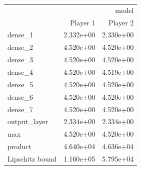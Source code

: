 \begin{tabular}{lrr}
\toprule
 & \multicolumn{2}{r}{model} \\
 & Player 1 & Player 2 \\
\midrule
dense\_1 & 2.332e+00 & 2.330e+00 \\
dense\_2 & 4.520e+00 & 4.520e+00 \\
dense\_3 & 4.520e+00 & 4.520e+00 \\
dense\_4 & 4.520e+00 & 4.519e+00 \\
dense\_5 & 4.520e+00 & 4.520e+00 \\
dense\_6 & 4.520e+00 & 4.520e+00 \\
dense\_7 & 4.520e+00 & 4.520e+00 \\
output\_layer & 2.334e+00 & 2.334e+00 \\
max & 4.520e+00 & 4.520e+00 \\
product & 4.640e+04 & 4.636e+04 \\
Lipschitz bound & 1.160e+05 & 5.795e+04 \\
\bottomrule
\end{tabular}
